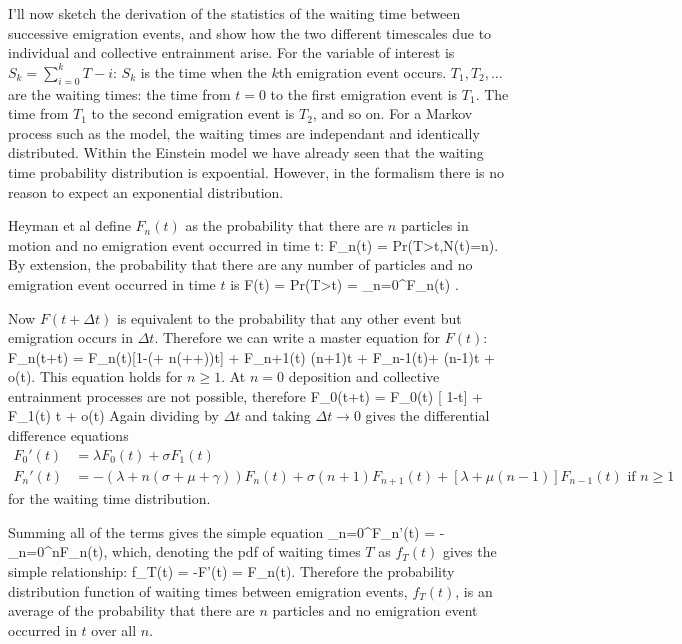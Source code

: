 I'll now sketch the \citet{Heyman2013} derivation of the statistics of the waiting time between successive emigration events, and show how the two different timescales due to individual and collective entrainment arise. 
For \citet{Heyman2013} the variable of interest is $S_k = \sum_{i=0}^k T-i$: $S_k$ is the time when the $k$th emigration event occurs. $T_1, T_2, \dots $ are the waiting times: the time from $t=0$ to the first emigration event is $T_1$. The time from $T_1$ to the second emigration event is $T_2$, and so on. 
For a Markov process such as the \citet{Ancey2008} model, the waiting times are independant and identically distributed. 
Within the Einstein model we have already seen that the waiting time probability distribution is expoential. 
However, in the \citet{Ancey2008} formalism there is no reason to expect an exponential distribution. 

Heyman et al define $F_n(t)$ as the probability that there are $n$ particles in motion and no emigration event occurred in time t: 
\be F_n(t) = Pr(T>t,N(t)=n).\ee
By extension, the probability that there are any number of particles and no emigration event occurred in time $t$ is 
\be F(t) = Pr(T>t) = \sum_{n=0}^\infty F_n(t) .\ee 

Now $F(t+\Delta t)$ is equivalent to the probability that any other event but emigration occurs in $\Delta t$. 
Therefore we can write a master equation for $F(t)$: 
\be F_n(t+\Delta t) = F_n(t)[1-(\lambda + n(\sigma+\mu+\gamma))\Delta t] + F_{n+1}(t) \sigma(n+1)\Delta t + F_{n-1}(t)\lambda + \mu(n-1)\Delta t + o(\Delta t).\ee
This equation holds for $n\geq 1$. At $n=0$ deposition and collective entrainment processes are not possible, therefore 
\be F_0(t+\Delta t) = F_0(t) [ 1-\lambda \Delta t] + F_1(t) \sigma \Delta t + o(\Delta t) \ee 
Again dividing by $\Delta t$ and taking $\Delta t \rightarrow 0$ gives the differential difference equations
\begin{align} 
F_0'(t) &= \lambda F_0(t) + \sigma F_1(t) \\
F_n'(t) &= -(\lambda + n(\sigma + \mu + \gamma))F_n(t) + \sigma(n+1)F_{n+1}(t) + [\lambda + \mu(n-1)]F_{n-1}(t) \text{ if } n\geq 1 \end{align} 
for the waiting time distribution. 

Summing all of the terms gives the simple equation 
\be \sum_{n=0}^\infty F_n'(t) = -\gamma \sum_{n=0}^\infty nF_n(t), \ee
which, denoting the pdf of waiting times $T$ as $f_T(t)$ gives the simple relationship: 
\be f_T(t) = -F'(t) = \gamma\bra F_n(t)\ket. \ee
Therefore the probability distribution function of waiting times between emigration events, $f_T(t)$, is an average of the probability that there are $n$ particles and no emigration event occurred in $t$ over all $n$. 


